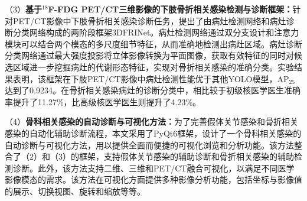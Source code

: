 \begin{cabstract}
    （3）\textbf{基于\(^{18}\)F-FDG PET/CT三维影像的下肢骨折相关感染检测与诊断框架：}针对PET/CT影像中下肢骨折相关感染诊断任务，提出了由病灶检测网络和病灶诊断分类网络构成的两阶段框架3DFRINet。病灶检测网络通过双分支设计和注意力模块可以结合两个模态的多尺度细节特征，从而准确地检测出病灶区域。病灶诊断分类网络通过最大强度投影将立体影像转换为平面图像，获取有效特征的同时对候选区域进一步挖掘病灶的代谢形态特征，实现对骨折相关感染的准确分类。实验结果表明，该框架在下肢PET/CT影像中病灶检测性能优于其他YOLO模型，AP\(_{25}\)达到了0.9234。在骨折相关感染病灶的诊断分类中，相比较于初级核医学医生准确率提升了11.27\%，比高级核医学医生则提升了4.23\%。

    （4）\textbf{骨科相关感染的自动诊断与可视化方法：}为了完善假体关节感染和骨折相关感染的自动化辅助诊断流程，本文采用了PyQt6框架，设计了一个骨科相关感染的自动诊断与可视化方法，用以提供全面而便捷的可视化浏览和分析功能。该方法整合了（2）和（3）的框架，支持假体关节感染的辅助诊断和骨折相关感染的辅助检测诊断。此外，该方法支持二维、三维和PET/CT融合可视化，以满足不同医学影像模态的需求。该方法在可视化方面提供多种影像分析功能，包括坐标与影像值的展示、切换视图、旋转和缩放等等。

\end{cabstract}


